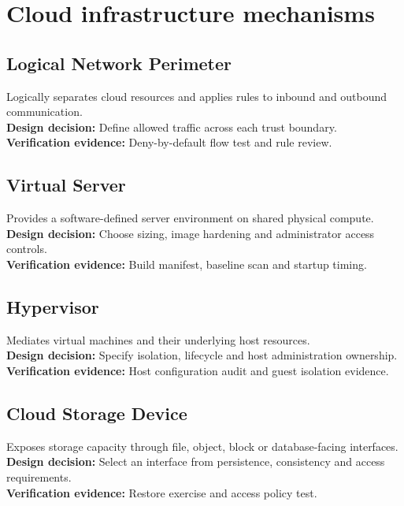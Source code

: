 \documentclass[10pt,letterpaper]{article}
\begin{document}
\section{Cloud infrastructure mechanisms}
\subsection{Logical Network Perimeter}
Logically separates cloud resources and applies rules to inbound and outbound communication.\\[4pt]
\textbf{Design decision:} Define allowed traffic across each trust boundary.\\[3pt]
\textbf{Verification evidence:} Deny-by-default flow test and rule review.\\[3pt]
\subsection{Virtual Server}
Provides a software-defined server environment on shared physical compute.\\[4pt]
\textbf{Design decision:} Choose sizing, image hardening and administrator access controls.\\[3pt]
\textbf{Verification evidence:} Build manifest, baseline scan and startup timing.\\[3pt]
\subsection{Hypervisor}
Mediates virtual machines and their underlying host resources.\\[4pt]
\textbf{Design decision:} Specify isolation, lifecycle and host administration ownership.\\[3pt]
\textbf{Verification evidence:} Host configuration audit and guest isolation evidence.\\[3pt]
\subsection{Cloud Storage Device}
Exposes storage capacity through file, object, block or database-facing interfaces.\\[4pt]
\textbf{Design decision:} Select an interface from persistence, consistency and access requirements.\\[3pt]
\textbf{Verification evidence:} Restore exercise and access policy test.\\[3pt]
\end{document}
